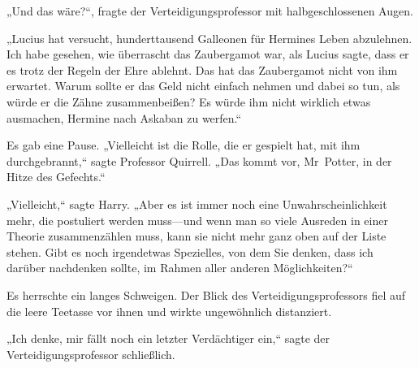 „Und das wäre?“, fragte der Verteidigungsprofessor mit halbgeschlossenen Augen.

„Lucius hat versucht, hunderttausend Galleonen für Hermines Leben abzulehnen. Ich habe gesehen, wie überrascht das Zaubergamot war, als Lucius sagte, dass er es trotz der Regeln der Ehre ablehnt. Das hat das Zaubergamot nicht von ihm erwartet. Warum sollte er das Geld nicht einfach nehmen und dabei so tun, als würde er die Zähne zusammenbeißen? Es würde ihm nicht wirklich etwas ausmachen, Hermine nach Askaban zu werfen.“

Es gab eine Pause. „Vielleicht ist die Rolle, die er gespielt hat, mit ihm durchgebrannt,“ sagte Professor Quirrell. „Das kommt vor, Mr~Potter, in der Hitze des Gefechts.“

„Vielleicht,“ sagte Harry. „Aber es ist immer noch eine Unwahrscheinlichkeit mehr, die postuliert werden muss—und wenn man so viele Ausreden in einer Theorie zusammenzählen muss, kann sie nicht mehr ganz oben auf der Liste stehen. Gibt es noch irgendetwas Spezielles, von dem Sie denken, dass ich darüber nachdenken sollte, im Rahmen aller anderen Möglichkeiten?“

Es herrschte ein langes Schweigen.
Der Blick des Verteidigungsprofessors fiel auf die leere Teetasse vor ihnen und wirkte ungewöhnlich distanziert.

„Ich denke, mir fällt noch ein letzter Verdächtiger ein,“ sagte der Verteidigungsprofessor schließlich.

